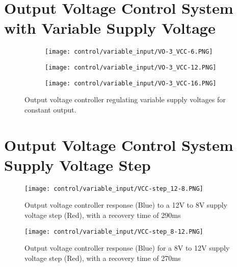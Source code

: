 \section*{Output Voltage Control System with Variable Supply Voltage} \label{A:control_supply_change}
\begin{figure}[H]
    \centering
    \begin{subfigure}{0.62\textwidth}
        \texttt{[image: control/variable\_input/VO-3\_VCC-6.PNG]}
    \end{subfigure}
    \begin{subfigure}{0.62\textwidth}
        \texttt{[image: control/variable\_input/VO-3\_VCC-12.PNG]}
    \end{subfigure}
    \begin{subfigure}{0.62\textwidth}
        \texttt{[image: control/variable\_input/VO-3\_VCC-16.PNG]}
    \end{subfigure}
    \caption{Output voltage controller regulating variable supply voltages for constant output.}
\end{figure}

\section*{Output Voltage Control System Supply Voltage Step} \label{A:control_supply_step}

\begin{figure}[H]
    \begin{center}
        \texttt{[image: control/variable\_input/VCC-step\_12-8.PNG]}
        \caption{Output voltage controller response (Blue) to a 12V to 8V supply voltage step (Red), with a recovery time of 290ms}
    \end{center}
\end{figure}

\begin{figure}[H]
    \begin{center}
        \texttt{[image: control/variable\_input/VCC-step\_8-12.PNG]}
        \caption{Output voltage controller response (Blue) for a 8V to 12V supply voltage step (Red), with a recovery time of 270ms}
    \end{center}
\end{figure}